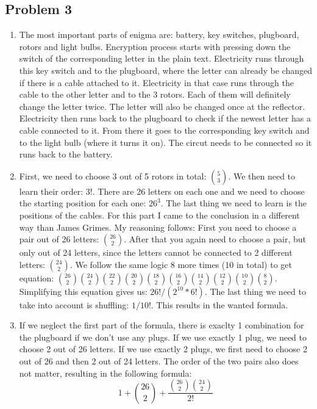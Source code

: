 \documentclass[a4paper,10pt]{article}
\begin{document}
\subsection*{Problem 3}
\begin{enumerate}[label= (\alph*)]

 \item The most important parts of enigma are: battery, key switches, plugboard, rotors and light bulbs. Encryption process starts with pressing down the switch of the corresponding letter in the plain text. Electricity runs through this key switch and to the plugboard, where the letter can already be changed if there is a cable attached to it. Electricity in that case runs through the cable to the other letter and to the 3 rotors. Each of them will definitely change the letter twice. The letter will also be changed once at the reflector. Electricity then runs back to the plugboard to check if the newest letter has a cable connected to it. From there it goes to the corresponding key switch and to the light bulb (where it turns it on). The circut needs to be connected so it runs back to the battery.
 \item First, we need to choose 3 out of 5 rotors in total: $\binom{5}{3}$. We then need to learn their order: $3!$. There are 26 letters on each one and we need to choose the starting position for each one: $26^3$. The last thing we need to learn is the positions of the cables. For this part I came to the conclusion in a different way than James Grimes. My reasoning follows: First you need to choose a pair out of 26 letters: $\binom{26}{2}$. After that you again need to choose a pair, but only out of 24 letters, since the letters cannot be connected to 2 different letters: $\binom{24}{2}$. We follow the same logic 8 more times (10 in total) to get equation: $\binom{26}{2}\binom{24}{2}\binom{22}{2}\binom{20}{2}\binom{18}{2}\binom{16}{2}\binom{14}{2}\binom{12}{2}\binom{10}{2}\binom{8}{2}$. Simplifying this equation gives us: $26! / (2^{10} * 6!)$. The last thing we need to take into account is shuffling: $1/10!$. This results in the wanted formula.
 \item If we neglect the first part of the formula, there is exaclty 1 combination for the plugboard if we don't use any plugs. If we use exactly 1 plug, we need to choose 2 out of 26 letters. If we use exactly 2 plugs, we first need to choose 2 out of 26 and then 2 out of 24 letters. The order of the two pairs also does not matter, resulting in the following formula:
 \[ 1 + \binom{26}{2} + \frac{\binom{26}{2}\binom{24}{2}}{2!} \]


\end{enumerate}
\end{document}
